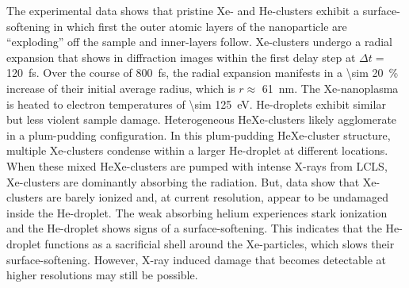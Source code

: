 %
The experimental data shows that pristine Xe- and He-clusters exhibit a surface-softening in which first the outer atomic layers of the nanoparticle are ``exploding'' off the sample and inner-layers follow. Xe-clusters undergo a radial expansion that shows in diffraction images within the first delay step at $\Delta t =$ \SI{120}{\femto\second}. Over the course of \SI{800}{\femto\second}, the radial expansion manifests in a \SI{\sim 20}{\percent} increase of their initial average radius, which is $r\approx$ \SI{61}{\nano\meter}. The Xe-nanoplasma is heated to electron temperatures of \SI{\sim 125}{\electronvolt}. He-droplets exhibit similar but less violent sample damage. Heterogeneous HeXe-clusters likely agglomerate in a plum-pudding configuration. In this plum-pudding HeXe-cluster structure, multiple Xe-clusters condense within a larger He-droplet at different locations. When these mixed HeXe-clusters are pumped with intense X-rays from LCLS, Xe-clusters are dominantly absorbing the radiation. But, data show that Xe-clusters are barely ionized and, at current resolution, appear to be undamaged inside the He-droplet. The weak absorbing helium experiences stark ionization and the He-droplet shows signs of a surface-softening. This indicates that the He-droplet functions as a sacrificial shell around the Xe-particles, which slows their surface-softening. However, X-ray induced damage that becomes detectable at higher resolutions may still be possible.\\[0.5\baselineskip]
%

